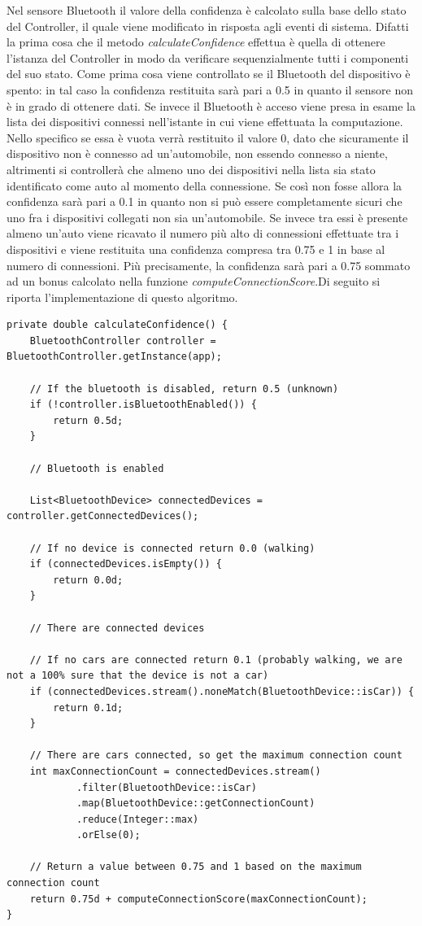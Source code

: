 Nel sensore Bluetooth il valore della confidenza è calcolato sulla base dello stato del Controller, il quale viene modificato in risposta agli eventi di sistema. Difatti la prima cosa che il metodo \textit{calculateConfidence} effettua è quella di ottenere l'istanza del Controller in modo da verificare sequenzialmente tutti i componenti del suo stato. Come prima cosa viene controllato se il Bluetooth del dispositivo è spento: in tal caso la confidenza restituita sarà pari a 0.5 in quanto il sensore non è in grado di ottenere dati. Se invece il Bluetooth è acceso viene presa in esame la lista dei dispositivi connessi nell'istante in cui viene effettuata la computazione. Nello specifico se essa è vuota verrà restituito il valore 0, dato che sicuramente il dispositivo non è connesso ad un'automobile, non essendo connesso a niente, altrimenti si controllerà che almeno uno dei dispositivi nella lista sia stato identificato come auto al momento della connessione. Se così non fosse allora la confidenza sarà pari a 0.1 in quanto non si può essere completamente sicuri che uno fra i dispositivi collegati non sia un'automobile. Se invece tra essi è presente almeno un'auto viene ricavato il numero più alto di connessioni effettuate tra i dispositivi e viene restituita una confidenza compresa tra 0.75 e 1 in base al numero di connessioni. Più precisamente, la confidenza sarà pari a 0.75 sommato ad un bonus calcolato nella funzione \textit{computeConnectionScore}.Di seguito si riporta l'implementazione di questo algoritmo.

\begin{verbatim}
private double calculateConfidence() {
    BluetoothController controller = BluetoothController.getInstance(app);

    // If the bluetooth is disabled, return 0.5 (unknown)
    if (!controller.isBluetoothEnabled()) {
        return 0.5d;
    }

    // Bluetooth is enabled

    List<BluetoothDevice> connectedDevices = controller.getConnectedDevices();

    // If no device is connected return 0.0 (walking)
    if (connectedDevices.isEmpty()) {
        return 0.0d;
    }

    // There are connected devices

    // If no cars are connected return 0.1 (probably walking, we are not a 100% sure that the device is not a car)
    if (connectedDevices.stream().noneMatch(BluetoothDevice::isCar)) {
        return 0.1d;
    }

    // There are cars connected, so get the maximum connection count
    int maxConnectionCount = connectedDevices.stream()
            .filter(BluetoothDevice::isCar)
            .map(BluetoothDevice::getConnectionCount)
            .reduce(Integer::max)
            .orElse(0);

    // Return a value between 0.75 and 1 based on the maximum connection count
    return 0.75d + computeConnectionScore(maxConnectionCount);
}
\end{verbatim}

